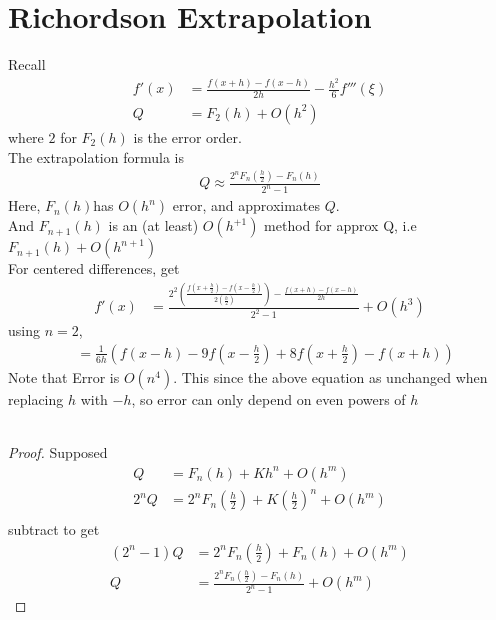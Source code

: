 \documentclass[11pt,oneside]{book}
\theoremstyle{break}
\theoremstyle{break}
\begin{document}
\section[Richordson Extrapolation]{Richordson Extrapolation}
Recall \begin{align*}
f'(x)&=\frac{f(x+h)-f(x-h)}{2h}-\frac{h^2}{6}f'''(\xi)\\
Q&=F_2(h)+O(h^2)
\end{align*}
where $2$ for $F_2(h)$ is the error order. \\
The extrapolation formula is \begin{align*}
Q\approx \frac{2^nF_n\left(\frac{h}{2} \right)-F_n(h)}{2^n-1}
\end{align*}
Here, $F_n(h)$has $O(h^n)$ error, and approximates $Q$.\\
And $F_{n+1}(h)$ is an (at least) $O(h^{+1}) $ method for approx Q, i.e $F_{n+1}(h)+O(h^{n+1})$\\
For centered differences, get \begin{align*}
f'(x)&=\frac{2^2\left(\frac{f(x+\frac{h}{2})-f(x-\frac{h}{2})}{2(\frac{h}{2})} \right)-\frac{f(x+h)-f(x-h)}{2h}}{2^2-1}+O(h^3)
\end{align*}
using $n=2$,\begin{align*}
&=\frac{1}{6h}\left(f(x-h)-9f\left(x-\frac{h}{2} \right)+8f\left(x+\frac{h}{2} \right)-f(x+h) \right)
\end{align*}
Note that Error is $O(n^4).$ This since the above equation as unchanged when replacing $h$ with $-h$, so error can only depend on even powers of $h$\\
\hfill\\
\begin{proof}
Supposed \begin{align*}
Q&=F_n(h)+Kh^n+O(h^m)\\
2^nQ&=2^nF_n\left(\frac{h}{2} \right)+K\left(\frac{h}{2} \right)^n+O(h^m)\\
\end{align*}
subtract to get \begin{align*}
(2^n-1)Q&=2^nF_n\left(\frac{h}{2} \right)+F_n(h)+O(h^m)\\
Q&=\frac{2^nF_n\left(\frac{h}{2} \right)-F_n(h)}{2^n-1}+O(h^m)
\end{align*}
\end{proof}
\end{document}
